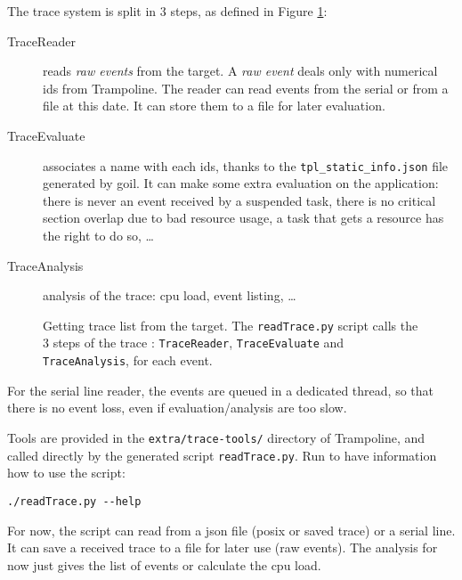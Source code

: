 The trace system is split in 3 steps, as defined in Figure \ref{fig:trace}:
\begin{description}
	\item[TraceReader] reads \textsl{raw events} from the target. A \textsl{raw event} deals only with numerical ids from Trampoline. The reader can read events from the serial or from a file at this date. It can store them to a file for later evaluation.
	\item[TraceEvaluate] associates a name with each ids, thanks to the \lstinline{tpl_static_info.json} file generated by goil. It can make some extra evaluation on the application: there is never an event received by a suspended task, there is no critical section overlap due to bad resource usage, a task that gets a resource has the right to do so, …
	\item[TraceAnalysis] analysis of the trace: cpu load, event listing, …
\end{description}

\begin{figure}[htbp]
    \centering
	\begin{adjustbox}{width=.7\linewidth,keepaspectratio}
		
	\end{adjustbox}
	\caption{Getting trace list from the target. The \lstinline{readTrace.py} script calls the 3 steps of the trace : \lstinline{TraceReader}, \lstinline{TraceEvaluate} and \lstinline{TraceAnalysis}, for each event.}
	\label{fig:trace}
\end{figure}

For the serial line reader, the events are queued in a dedicated thread, so that there is no event loss, even if evaluation/analysis are too slow.


Tools are provided in the \texttt{extra/trace-tools/} directory of Trampoline, and called directly by the generated script \lstinline{readTrace.py}. Run to have information how to use the script:

\begin{lstlisting}
./readTrace.py --help
\end{lstlisting}

For now, the script can read from a json file (posix or saved trace) or a serial line. It can save a received trace to a file for later use (raw events). The analysis for now just gives the list of events or calculate the cpu load.

